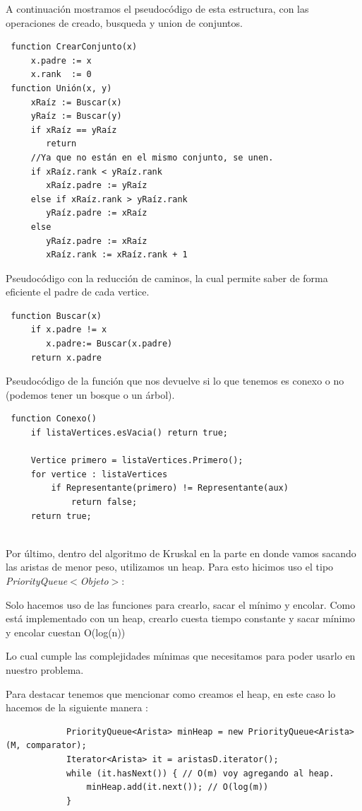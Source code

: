 A continuación mostramos el pseudocódigo de esta estructura, con las operaciones de creado, busqueda y union de conjuntos.

\begin{verbatim}
 function CrearConjunto(x)
     x.padre := x
     x.rank  := 0
 function Unión(x, y)
     xRaíz := Buscar(x)
     yRaíz := Buscar(y)
     if xRaíz == yRaíz
        return
     //Ya que no están en el mismo conjunto, se unen.
     if xRaíz.rank < yRaíz.rank
        xRaíz.padre := yRaíz
     else if xRaíz.rank > yRaíz.rank
        yRaíz.padre := xRaíz
     else
        yRaíz.padre := xRaíz
        xRaíz.rank := xRaíz.rank + 1
\end{verbatim}

Pseudocódigo con la reducción de caminos, la cual permite saber de forma eficiente el padre de cada vertice.
\begin{verbatim}
 function Buscar(x)
     if x.padre != x
        x.padre:= Buscar(x.padre)
     return x.padre
\end{verbatim}

Pseudocódigo de la función que nos devuelve si lo que tenemos es conexo o no (podemos tener un bosque o un árbol).
\begin{verbatim}
 function Conexo()
     if listaVertices.esVacia() return true;
	
     Vertice primero = listaVertices.Primero();
     for vertice : listaVertices 
         if Representante(primero) != Representante(aux) 
             return false;
     return true;
	
\end{verbatim}

Por último, dentro del algoritmo de Kruskal en la parte en donde vamos sacando las aristas de menor peso, utilizamos un heap. Para esto hicimos uso el tipo \emph{PriorityQueue$<$Objeto$>$}:

Solo hacemos uso de las funciones para crearlo, sacar el mínimo y encolar. Como está implementado con un heap, crearlo cuesta tiempo constante y sacar mínimo y encolar cuestan O(log(n))

Lo cual cumple las complejidades mínimas que necesitamos para poder usarlo en nuestro problema. 

Para destacar tenemos que mencionar como creamos el heap, en este caso lo hacemos de la siguiente manera :

	\begin{lstlisting}
	    	PriorityQueue<Arista> minHeap = new PriorityQueue<Arista>(M, comparator);
			Iterator<Arista> it = aristasD.iterator();
			while (it.hasNext()) { // O(m) voy agregando al heap.
				minHeap.add(it.next()); // O(log(m))
			}
	\end{lstlisting}
    
